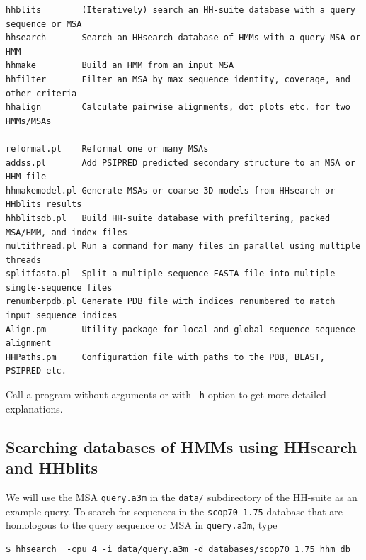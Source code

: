 \documentclass[11pt,a4paper]{article}
\begin{document}
\small 
\begin{verbatim}
hhblits        (Iteratively) search an HH-suite database with a query sequence or MSA
hhsearch       Search an HHsearch database of HMMs with a query MSA or HMM
hhmake         Build an HMM from an input MSA 
hhfilter       Filter an MSA by max sequence identity, coverage, and other criteria
hhalign        Calculate pairwise alignments, dot plots etc. for two HMMs/MSAs

reformat.pl    Reformat one or many MSAs
addss.pl       Add PSIPRED predicted secondary structure to an MSA or HHM file
hhmakemodel.pl Generate MSAs or coarse 3D models from HHsearch or HHblits results	
hhblitsdb.pl   Build HH-suite database with prefiltering, packed MSA/HMM, and index files
multithread.pl Run a command for many files in parallel using multiple threads
splitfasta.pl  Split a multiple-sequence FASTA file into multiple single-sequence files
renumberpdb.pl Generate PDB file with indices renumbered to match input sequence indices
Align.pm       Utility package for local and global sequence-sequence alignment
HHPaths.pm     Configuration file with paths to the PDB, BLAST, PSIPRED etc.
\end{verbatim} 
\normalsize

Call a program without arguments or with \verb`-h` option to get more detailed explanations.


\subsection{Searching databases of HMMs using HHsearch and HHblits}\label{searching_hm_dbs}

We will use the MSA \verb`query.a3m` in the \verb`data/` subdirectory of the HH-suite as an example query. To search for sequences in the \verb`scop70_1.75` database that are homologous to the query sequence or MSA in \verb`query.a3m`, type

\begin{verbatim}
$ hhsearch  -cpu 4 -i data/query.a3m -d databases/scop70_1.75_hhm_db
\end{verbatim}
\end{document}
